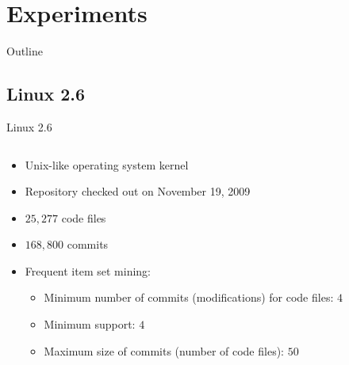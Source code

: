 

\section{Experiments}

\begin{frame}{Outline}
  \tableofcontents[current]
\end{frame}

\note{
}

\subsection{Linux 2.6}

\begin{frame}{Linux 2.6}
  \begin{columns}[c]
    \begin{column}{0.60\textwidth}
      \begin{itemize}
      \item Unix-like operating system kernel
      \item Repository checked out on November 19, 2009
      \item $25,277$ code files
      \item $168,800$ commits
      \item Frequent item set mining:
        \begin{itemize}
        \item Minimum number of commits (modifications) for code
          files: $4$
        \item Minimum support: $4$
        \item Maximum size of commits (number of code files): $50$
        \end{itemize}
      \end{itemize}
    \end{column}
    \begin{column}{0.40\textwidth}

\end{column}
\end{columns}
\end{frame}
